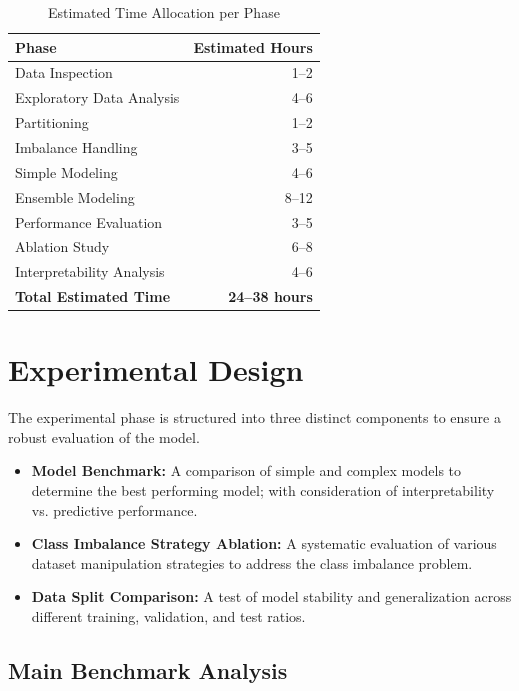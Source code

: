 \documentclass{article}
\begin{document}
\begin{table}[h]
    \centering
    \caption{Estimated Time Allocation per Phase}
    \begin{tabular}{lr}
        \hline
        \textbf{Phase} & \textbf{Estimated Hours} \\ \hline
        Data Inspection & 1--2 \\
        Exploratory Data Analysis & 4--6 \\
        Partitioning & 1--2 \\
        Imbalance Handling & 3--5 \\
        Simple Modeling & 4--6 \\
        Ensemble Modeling & 8--12 \\
        Performance Evaluation & 3--5 \\
        Ablation Study & 6--8 \\
        Interpretability Analysis & 4--6 \\ \hline
        \textbf{Total Estimated Time} & \textbf{24--38 hours} \\ \hline
    \end{tabular}
\end{table}
\clearpage
\section*{Experimental Design}
 
The experimental phase is structured into three distinct components to ensure a robust evaluation of the model.
 
\begin{itemize}
    \item \textbf{Model Benchmark:} A comparison of simple and complex models to determine the best performing model; with consideration of interpretability vs. predictive performance.
   
    \item \textbf{Class Imbalance Strategy Ablation:} A systematic evaluation of various dataset manipulation strategies to address the class imbalance problem.
   
    \item \textbf{Data Split Comparison:} A test of model stability and generalization across different training, validation, and test ratios.
\end{itemize}
 
\subsection*{Main Benchmark Analysis}
 
\end{document}
